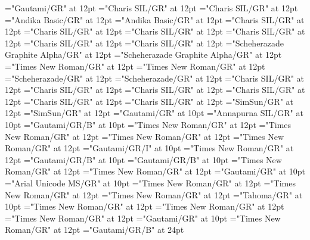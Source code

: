 \documentclass[a4paper]{article}
\begin{document}
\font\spante="Gautami/GR" at 12pt
\font\divth="Charis SIL/GR" at 12pt
\font\spanth="Charis SIL/GR" at 12pt
\font\divtpi="Andika Basic/GR" at 12pt
\font\spantpi="Andika Basic/GR" at 12pt
\font\divtrfonipaxemic="Charis SIL/GR" at 12pt
\font\spantrfonipaxemic="Charis SIL/GR" at 12pt
\font\divtrfonipa="Charis SIL/GR" at 12pt
\font\spantrfonipa="Charis SIL/GR" at 12pt
\font\divtr="Charis SIL/GR" at 12pt
\font\spantr="Charis SIL/GR" at 12pt
\font\divurArab="Scheherazade Graphite Alpha/GR" at 12pt
\font\spanurArab="Scheherazade Graphite Alpha/GR" at 12pt
\font\divurxind="Times New Roman/GR" at 12pt
\font\spanurxind="Times New Roman/GR" at 12pt
\font\divur="Scheherazade/GR" at 12pt
\font\spanur="Scheherazade/GR" at 12pt
\font\divvi="Charis SIL/GR" at 12pt
\font\spanvi="Charis SIL/GR" at 12pt
\font\divxas="Charis SIL/GR" at 12pt
\font\spanxas="Charis SIL/GR" at 12pt
\font\divzhCNpinyin="Charis SIL/GR" at 12pt
\font\spanzhCNpinyin="Charis SIL/GR" at 12pt
\font\divzhCN="SimSun/GR" at 12pt
\font\spanzhCN="SimSun/GR" at 12pt
\font\xitemte="Gautami/GR" at 10pt
\font\xitemhi="Annapurna SIL/GR" at 10pt
\font\xitemxitemcomplexformformbefore="Gautami/GR/B" at 10pt
\font\xitemxitemcomplexformrefsbefore="Times New Roman/GR" at 12pt
\font\xitemxitemdefinitionbefore="Times New Roman/GR" at 12pt
\font\xitemxitementryrefcomponentbefore="Times New Roman/GR" at 12pt
\font\xitemxitementryreftypebefore="Times New Roman/GR" at 12pt
\font\xitemxitemexamplebefore="Gautami/GR/I" at 10pt
\font\xitemxitemexamplesbefore="Times New Roman/GR" at 12pt
\font\xitemxitemheadwordbefore="Gautami/GR/B" at 10pt
\font\xitemxitemLexEntrypublishStemComponentTargetHeadWordRefbefore="Gautami/GR/B" at 10pt
\font\xitemxitemLexEntryTypepublishStemComplexFormTypeReverseAbbrPubbefore="Times New Roman/GR" at 12pt
\font\xitemxitemLexEntryTypepublishStemEntryTypeAbbreviationPubbefore="Times New Roman/GR" at 12pt
\font\xitemxitemLexSensepublishStemGlossPubLdbefore="Gautami/GR" at 10pt
\font\xitemxitemLexSensepublishStemGlossPubLebefore="Arial Unicode MS/GR" at 10pt
\font\xitemxitempartofspeechbefore="Times New Roman/GR" at 12pt
\font\xitemxitempictureLabelbefore="Times New Roman/GR" at 12pt
\font\xitemxitemprimaryrefsbefore="Times New Roman/GR" at 12pt
\font\xitemxitempronunciationbefore="Tahoma/GR" at 10pt
\font\xitemxitempronunciationsbefore="Times New Roman/GR" at 12pt
\font\sensesensesensesbefore="Times New Roman/GR" at 12pt
\font\xitemxitemtranslationbefore="Times New Roman/GR" at 12pt
\font\xitemxitemtranslationLdbefore="Gautami/GR" at 10pt
\font{}="Times New Roman/GR" at 12pt
\font{}="Gautami/GR/B" at 24pt
\end{document}
